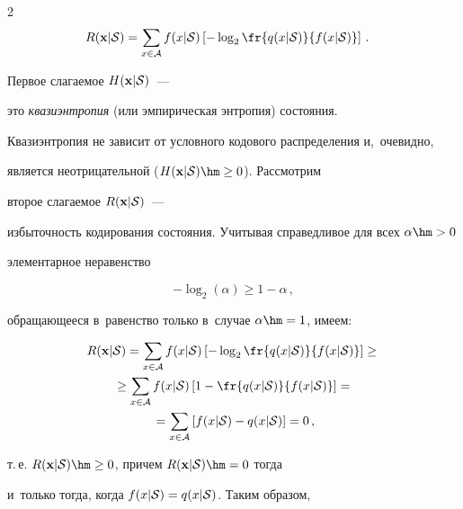 \begin{multicols}{2}
\begin{align}
\label{eq9}

R(\mathbf{x}|{\cal S}) &= \sum\limits_{x\in{\cal A}} f(x|{\cal S}) 

\left[-\log_{2}\fr{q(x|{\cal S})}{f(x|{\cal S})}\right]\,.

\end{align}

Первое слагаемое $H(\mathbf{x}|{\cal S})$~--- 

это \textit{квазиэнтропия} (или эмпирическая энтропия) состояния. 

Квазиэнтропия не зависит от условного кодового распределения и,~очевидно, 

является неотрицательной  ($H(\mathbf{x}|{\cal S})\hm\ge 0$). Рассмотрим 

второе слагаемое $R(\mathbf{x}|{\cal S})$~--- 

избыточность кодирования состояния. Учитывая справедливое для всех $\alpha\hm>0$ 

элементарное неравенство

\begin{equation}

\label{eq10}

-\log_{2}(\alpha) \ge 1-\alpha\,,

\end{equation}

обращающееся в~равенство только в~случае $\alpha\hm=1$, имеем:

\begin{multline*}

R(\mathbf{x}|{\cal S}) = \sum\limits_{x\in{\cal A}} f(x|{\cal S}) 

\left[-\log_{2}\fr{q(x|{\cal S})}{f(x|{\cal S})}\right] \ge{}\\

{}\ge

\sum\limits_{x\in{\cal A}} f(x|{\cal S}) \left[1 - 

\fr{q(x|{\cal S})}{f(x|{\cal S})}\right] ={}\\

{}=

\sum\limits_{x\in{\cal A}} \left[f(x|{\cal S}) - q(x|{\cal S})\right] = 0\,,

\end{multline*}

т.\,е. $R(\mathbf{x}|{\cal S})\hm\ge0$, причем $R(\mathbf{x}|{\cal S})\hm=0$ тогда 

и~только тогда, когда $f(x|{\cal S})= q(x|{\cal S})$. Таким образом, 


\end{multicols}

